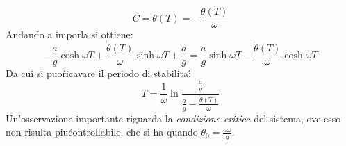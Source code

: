 \documentclass[12pt, a4paper]{book}
\theoremstyle{theorem}
\begin{document}
				\begin{equation}
					C=\theta(T)=-\frac{\dot{\theta}(T)}{\omega}
				\end{equation}
				Andando a imporla si ottiene:
				\begin{equation*}
					-\frac{a}{g}\cosh\omega T + \frac{\dot{\theta}(T)}{\omega}\sinh\omega T + \frac{a}{g} = \frac{a}{g}\sinh\omega T - \frac{\dot{\theta}(T)}{\omega}\cosh\omega T
				\end{equation*}
				Da cui si puo\' ricavare il periodo di stabilita\':
				\begin{equation}
					T=\frac{1}{\omega}\ln\frac{\frac{a}{g}}{\frac{a}{g}-\frac{\dot{\theta}(T)}{\omega}}
				\end{equation}
				Un'osservazione importante riguarda la \emph{condizione critica} del sistema, ove esso non risulta piu\' controllabile, che si ha quando $\dot{\theta}_0=\frac{a\omega}{g}$.
\end{document}
